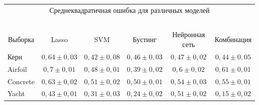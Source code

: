 \begin{table}\small

\begin{center}

    \label{table-1}



\tabcolsep=5pt

    \begin{tabular}{|l|c|c|c|c|c|}

        \multicolumn{6}{c}{Среднеквадратичная ошибка для различных моделей}\\

        \multicolumn{6}{c}{\ }\\[-6pt]

        \hline

        \multicolumn{1}{|c|}{{Выборка}}

        & {Lasso} & {SVM}  & {Бустинг} & {Нейронная сеть}   & {Комбинация} \\ 

        \hline

        \multicolumn{1}{|l|}{{Керн}}  & $0{,}64 \pm 0{,}03$  & $0{,}42 \pm 0{,}08$ & $0{,}46 \pm 0,03$    & $0,47 \pm 0,02$ & $0{,}44 \pm 0{,}05$      \\ 


        \multicolumn{1}{|l|}{{Airfoil}}  & \hphantom{9}$0{,}7 \pm 0{,}01$   & $0{,}48 \pm 0{,}01$ & $0,39 \pm 0,02$    & \hphantom{9}$0,6 \pm 0,02$ & $0{,}61 \pm 0{,}01$      \\ 


        \multicolumn{1}{|l|}{{Concrete}} & $0{,}63 \pm 0{,}02$  & $0{,}51 \pm 0{,}02$ & $0,50 \pm 0,01$    & $0,54 \pm 0,03$ & $0{,}55 \pm 0{,}01$      \\ 


        \multicolumn{1}{|l|}{{Yacht}}    & $0{,}43 \pm 0{,}01$  & $0{,}31 \pm 0{,}03$ & $0,24 \pm 0,02$    & $0,51 \pm 0,02$ & $0{,}15 \pm 0{,}02$      \\ 

        \hline

    \end{tabular}

    \end{center}

    \vspace*{-12pt}

\end{table}



